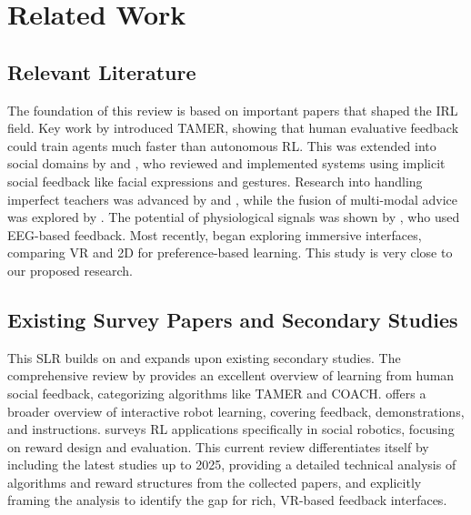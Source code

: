 \documentclass[rnd]{mas_proposal}
\begin{document}
\section{Related Work}
\label{sec:related}

\subsection{Relevant Literature}
The foundation of this review is based on important papers that shaped the IRL field. Key work by \citet{BradleyKnox2008} introduced TAMER, showing that human evaluative feedback could train agents much faster than autonomous RL. This was extended into social domains by \citet{Lin2020a} and \citet{Lin2020}, who reviewed and implemented systems using implicit social feedback like facial expressions and gestures. Research into handling imperfect teachers was advanced by \citet{Faulkner2020} and \citet{KesslerFaulkner2021}, while the fusion of multi-modal advice was explored by \citet{9794595}. The potential of physiological signals was shown by \citet{Xu2021}, who used EEG-based feedback. Most recently, \citet{Heuvel2025} began exploring immersive interfaces, comparing VR and 2D for preference-based learning. This study is very close to our proposed research.

\subsection{Existing Survey Papers and Secondary Studies}
This SLR builds on and expands upon existing secondary studies. The comprehensive review by \citet{Lin2020} provides an excellent overview of learning from human social feedback, categorizing algorithms like TAMER and COACH. \citet{Chetouani2021} offers a broader overview of interactive robot learning, covering feedback, demonstrations, and instructions. \citet{Akalin2021} surveys RL applications specifically in social robotics, focusing on reward design and evaluation. This current review differentiates itself by including the latest studies up to 2025, providing a detailed technical analysis of algorithms and reward structures from the collected papers, and explicitly framing the analysis to identify the gap for rich, VR-based feedback interfaces.
\end{document}
